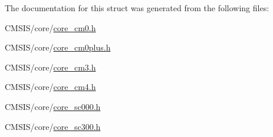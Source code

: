 The documentation for this struct was generated from the following files\+:\begin{DoxyCompactItemize}
\item 
C\+M\+S\+I\+S/core/\mbox{\hyperlink{core__cm0_8h}{core\+\_\+cm0.\+h}}\item 
C\+M\+S\+I\+S/core/\mbox{\hyperlink{core__cm0plus_8h}{core\+\_\+cm0plus.\+h}}\item 
C\+M\+S\+I\+S/core/\mbox{\hyperlink{core__cm3_8h}{core\+\_\+cm3.\+h}}\item 
C\+M\+S\+I\+S/core/\mbox{\hyperlink{core__cm4_8h}{core\+\_\+cm4.\+h}}\item 
C\+M\+S\+I\+S/core/\mbox{\hyperlink{core__sc000_8h}{core\+\_\+sc000.\+h}}\item 
C\+M\+S\+I\+S/core/\mbox{\hyperlink{core__sc300_8h}{core\+\_\+sc300.\+h}}\end{DoxyCompactItemize}
